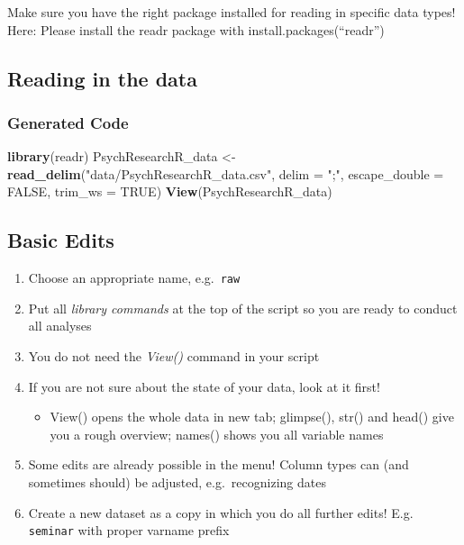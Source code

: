 \documentclass[
]{book}
\newenvironment{Shaded}{\begin{snugshade}}{\end{snugshade}}
\newcommand{\AttributeTok}[1]{\textcolor[rgb]{0.13,0.29,0.53}{#1}}
\newcommand{\ConstantTok}[1]{\textcolor[rgb]{0.56,0.35,0.01}{#1}}
\newcommand{\FunctionTok}[1]{\textcolor[rgb]{0.13,0.29,0.53}{\textbf{#1}}}
\newcommand{\NormalTok}[1]{#1}
\newcommand{\OtherTok}[1]{\textcolor[rgb]{0.56,0.35,0.01}{#1}}
\newcommand{\StringTok}[1]{\textcolor[rgb]{0.31,0.60,0.02}{#1}}
\providecommand{\tightlist}{%
  \setlength{\itemsep}{0pt}\setlength{\parskip}{0pt}}
\begin{document}
Make sure you have the right package installed for reading in specific data types! Here: Please install the readr package with install.packages(``readr'')

\subsection{Reading in the data}\label{reading-in-the-data}

\subsubsection{Generated Code}\label{generated-code}

\begin{Shaded}
\begin{Highlighting}[]
\FunctionTok{library}\NormalTok{(readr)}
\NormalTok{PsychResearchR\_data }\OtherTok{\textless{}{-}} \FunctionTok{read\_delim}\NormalTok{(}\StringTok{"data/PsychResearchR\_data.csv"}\NormalTok{, }
    \AttributeTok{delim =} \StringTok{";"}\NormalTok{, }\AttributeTok{escape\_double =} \ConstantTok{FALSE}\NormalTok{, }\AttributeTok{trim\_ws =} \ConstantTok{TRUE}\NormalTok{)}
\FunctionTok{View}\NormalTok{(PsychResearchR\_data)}
\end{Highlighting}
\end{Shaded}

\subsection{\texorpdfstring{Basic Edits }{Basic Edits }}\label{basic-edits}

\begin{enumerate}
\def\labelenumi{\arabic{enumi}.}
\tightlist
\item
  Choose an appropriate name, e.g.~\texttt{raw}
\item
  Put all \emph{library commands} at the top of the script so you are ready to conduct all analyses
\item
  You do not need the \emph{View()} command in your script
\item
  If you are not sure about the state of your data, look at it first!

  \begin{itemize}
  \tightlist
  \item
    View() opens the whole data in new tab; glimpse(), str() and head() give you a rough overview; names() shows you all variable names
  \end{itemize}
\item
  Some edits are already possible in the menu! Column types can (and sometimes should) be adjusted, e.g.~recognizing dates
\item
  Create a new dataset as a copy in which you do all further edits! E.g. \texttt{seminar} with proper varname prefix
\end{enumerate}
\end{document}

